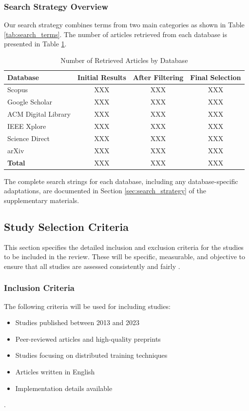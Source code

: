 \subsubsection{Search Strategy Overview}
Our search strategy combines terms from two main categories as shown in Table \ref{tab:search_terms}. The number of articles retrieved from each database is presented in Table \ref{tab:search_results}.

\begin{table}[h]
    \centering
    \caption{Number of Retrieved Articles by Database}
    \label{tab:search_results}
    \begin{tabular}{|l|c|c|c|}
        \hline
        \textbf{Database} & \textbf{Initial Results} & \textbf{After Filtering} & \textbf{Final Selection} \\
        \hline
        Scopus & XXX & XXX & XXX \\
        \hline
        Google Scholar & XXX & XXX & XXX \\
        \hline
        ACM Digital Library & XXX & XXX & XXX \\
        \hline
        IEEE Xplore & XXX & XXX & XXX \\
        \hline
        Science Direct & XXX & XXX & XXX \\
        \hline
        arXiv & XXX & XXX & XXX \\
        \hline
        \textbf{Total} & XXX & XXX & XXX \\
        \hline
    \end{tabular}
\end{table}

The complete search strings for each database, including any database-specific adaptations, are documented in Section \ref{sec:search_strategy} of the supplementary materials.

\subsection{Study Selection Criteria}
\label{sec:study-selection-criteria}
This section specifies the detailed inclusion and exclusion criteria for the studies to be included
in the review. These will be specific, measurable, and objective to ensure that all studies are
assessed consistently and fairly \cite{ben-nun_demystifying_2020}.

\subsubsection{Inclusion Criteria}
The following criteria will be used for including studies:
\begin{itemize}
    \item Studies published between 2013 and 2023
    \item Peer-reviewed articles and high-quality preprints
    \item Studies focusing on distributed training techniques
    \item Articles written in English
    \item Implementation details available
\end{itemize}
\cite{verbraeken_survey_2021,ben-nun_demystifying_2020}.

